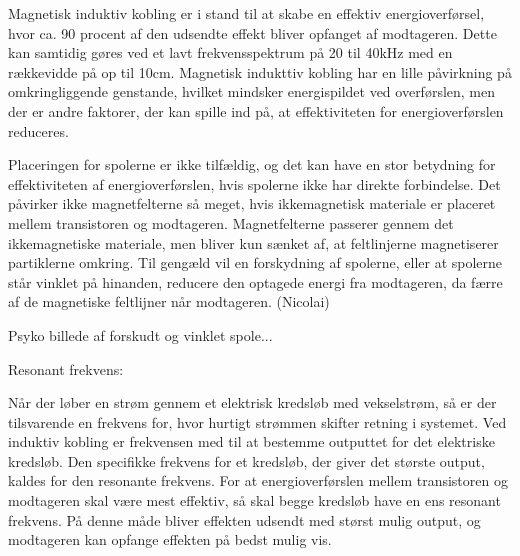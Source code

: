 Magnetisk induktiv kobling er i stand til at skabe en effektiv energioverførsel, hvor ca. 90 procent af den udsendte effekt bliver opfanget af modtageren. Dette kan samtidig gøres ved et lavt frekvensspektrum på 20 til 40kHz med en rækkevidde på op til 10cm. Magnetisk indukttiv kobling har en lille påvirkning på omkringliggende genstande, hvilket mindsker energispildet ved overførslen, men der er andre faktorer, der kan spille ind på, at effektiviteten for energioverførslen reduceres.

Placeringen for spolerne er ikke tilfældig, og det kan have en stor betydning for effektiviteten af energioverførslen, hvis spolerne ikke har direkte forbindelse. Det påvirker ikke magnetfelterne så meget, hvis ikkemagnetisk materiale er placeret mellem transistoren og modtageren. Magnetfelterne passerer gennem det ikkemagnetiske materiale, men bliver kun sænket af, at feltlinjerne magnetiserer partiklerne omkring. Til gengæld vil en forskydning af spolerne, eller at spolerne står vinklet på hinanden, reducere den optagede energi fra modtageren, da færre af de magnetiske feltlijner når modtageren. (Nicolai)

Psyko billede af forskudt og vinklet spole...

Resonant frekvens:

Når der løber en strøm gennem et elektrisk kredsløb med vekselstrøm, så er der tilsvarende en frekvens for, hvor hurtigt strømmen skifter retning i systemet. Ved induktiv kobling er frekvensen med til at bestemme outputtet for det elektriske kredsløb. Den specifikke frekvens for et kredsløb, der giver det største output, kaldes for den resonante frekvens. For at energioverførslen mellem transistoren og modtageren skal være mest effektiv, så skal begge kredsløb have en ens resonant frekvens. På denne måde bliver effekten udsendt med størst mulig output, og modtageren kan opfange effekten på bedst mulig vis.